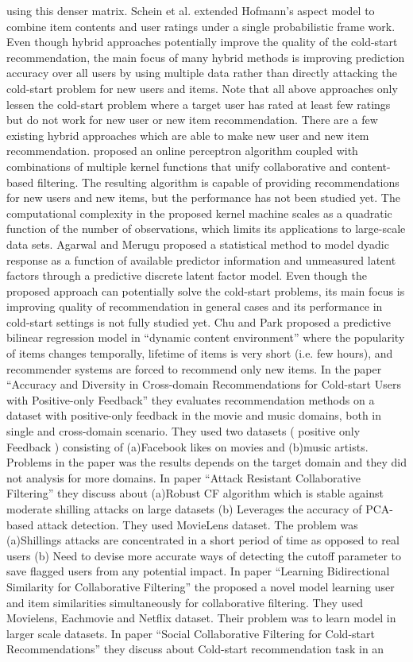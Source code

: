 \documentclass[document.tex]{subfiles}
\begin{document}
using this denser matrix. Schein et al.\cite{a21} extended Hofmann's aspect model to combine item contents and user ratings under a single probabilistic frame work. Even though hybrid approaches potentially improve the quality of the cold-start recommendation, the main focus of many hybrid methods is improving prediction accuracy over all users by using multiple data rather than directly attacking the cold-start problem for new users and items. Note that all above approaches only lessen the cold-start problem where a target user has rated at least few ratings but do not work for new user or new item recommendation. There are a few existing hybrid approaches which are able to make new user and new item recommendation. \cite{a22} proposed an online perceptron algorithm coupled with combinations of multiple kernel functions that unify collaborative and content-based filtering. The resulting algorithm is capable of providing recommendations for new users and new items, but the performance has not been studied yet. The computational complexity in the proposed kernel machine scales as a quadratic function of the number of observations, which limits its applications to large-scale data sets. Agarwal and Merugu \cite{a23} proposed a statistical method to model dyadic response as a function of available predictor information and unmeasured latent factors through a predictive discrete latent factor model. Even though the proposed approach can potentially solve the cold-start problems, its main focus is improving quality of recommendation in general cases and its performance in cold-start settings is not fully studied yet. Chu and Park \cite{a24} proposed a predictive bilinear regression model in “dynamic content environment” where the popularity of items changes temporally, lifetime of items is very short (i.e. few hours), and recommender systems are forced to recommend only new items. In the paper “Accuracy and Diversity in Cross-domain Recommendations for Cold-start Users with Positive-only Feedback” \cite{a25} they evaluates recommendation methods on a dataset with positive-only feedback in the movie and music domains, both in single and cross-domain scenario. They used two datasets ( positive only Feedback ) consisting of (a)Facebook likes on movies and (b)music artists. Problems in the paper was the results depends on the target domain and they did not analysis for more domains. In paper “Attack Resistant Collaborative Filtering” \cite{a26} they discuss about (a)Robust CF algorithm which is stable against moderate shilling attacks on large datasets (b) Leverages the accuracy of PCA-based attack detection. They used MovieLens dataset. The problem was (a)Shillings attacks are concentrated in a short period of time as opposed to real users (b) Need to devise more accurate ways of detecting the cutoff parameter to save flagged users from any potential impact. In paper “Learning Bidirectional Similarity for Collaborative Filtering” \cite{a27} the proposed a novel model learning user and item similarities simultaneously for collaborative filtering. They used Movielens, Eachmovie and Netflix dataset. Their problem was to learn model in larger scale datasets. In paper “Social Collaborative Filtering for Cold-start Recommendations” they discuss about Cold-start recommendation task in an 
\end{document}
